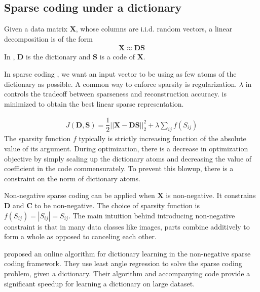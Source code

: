 \subsection{Sparse coding under a dictionary}

Given a data matrix $\mathbf{X}$, whose columns are i.i.d. random vectors, a linear decomposition is of the form 
\begin{align}
    \mathbf{X} \approx \mathbf{D} \mathbf{S} \label{eqn:lineardecomp}
\end{align}
In , $\mathbf{D}$ is the dictionary and $\mathbf{S}$ is a code of $\mathbf{X}$.

In sparse coding \cite{harpur1996sc}, we want an input vector to be using as few atoms of the dictionary as possible. A common way to enforce sparsity is regularization. $\lambda$ in  controls the tradeoff between sparseness and reconstruction accuracy.  is minimized to obtain the best linear sparse representation.

\begin{align}
    J(\mathbf{D}, \mathbf{S}) = \dfrac{1}{2} || \mathbf{X} - \mathbf{D} \mathbf{S} ||_2^2 + \lambda \sum_{ij} f(S_{ij}) \label{eqn:sparsecoding}
\end{align}
The sparsity function $f$ typically is strictly increasing function of the absolute value of its argument. During optimization, there is a decrease in optimization objective by simply scaling up the dictionary atoms and decreasing the value of coefficient in the code commensurately. To prevent this blowup, there is a constraint on the norm of dictionary atoms.


Non-negative sparse coding \cite{hoyer2002nnsc} can be applied when $\mathbf{X}$ is non-negative. It constrains $\mathbf{D}$ and $\mathbf{C}$ to be non-negative. The choice of sparsity function is $f(S_{ij}) = | S_{ij} | = S_{ij}$. The main intuition behind introducing non-negative constraint is that in many data classes like images, parts combine additively to form a whole as opposed to canceling each other.

\cite{mairal2009online} proposed an online algorithm for dictionary learning in the non-negative sparse coding framework. They use least angle regression to solve the sparse coding problem, given a dictionary. Their algorithm and accompanying code provide a significant speedup for learning a  dictionary on large dataset.



